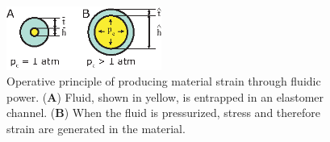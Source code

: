 \begin{figure}[htb]
\centering
\includegraphics[width=2.0in]{figures/actuators/FluidicPower.eps}
\caption[Operative principle of producing material strain through fluidic power.]{Operative principle of producing material strain through fluidic power. (\textbf{A}) Fluid, shown in yellow, is entrapped in an elastomer channel. (\textbf{B}) When the fluid is pressurized, stress and therefore strain are generated in the material. }\label{fig:FluidicPower}
\end{figure}
